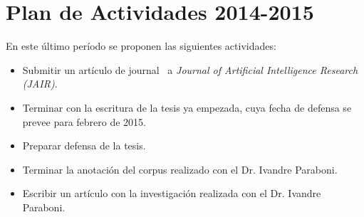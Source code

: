 \section{Plan de Actividades 2014-2015}
\label{plandetrabajo}

En este \'ultimo per\'iodo se proponen las siguientes actividades:

\begin{itemize}

\item Submitir un art\'iculo de journal~\cite{benotti-altamirano-jair} a \emph{Journal of Artificial Intelligence Research (JAIR)}.
\item Terminar con la escritura de la tesis ya empezada, cuya fecha de defensa se prevee para febrero de 2015.
\item Preparar defensa de la tesis.
\item Terminar la anotaci\'on del corpus realizado con el Dr. Ivandre Paraboni.
\item Escribir un art\'iculo con la investigaci\'on realizada con el Dr. Ivandre Paraboni.

\end{itemize}

